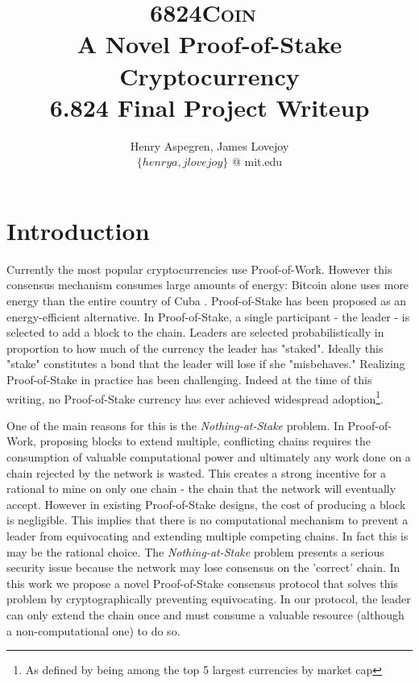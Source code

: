 \documentclass{article}
\newcommand{\coin}{ \textsc{6824Coin}\ }
\begin{document}
\title{%
  \coin \\ 
  A Novel Proof-of-Stake Cryptocurrency\\
  \large 6.824 Final Project Writeup}
\author{Henry Aspegren, James Lovejoy \\ $\{ henrya, jlovejoy \}$ @ mit.edu}
\maketitle

\section{Introduction}

Currently the most popular cryptocurrencies use Proof-of-Work. However this consensus mechanism consumes large amounts of energy: Bitcoin alone uses more energy than the entire country of Cuba \cite{energy}. Proof-of-Stake has been proposed as an energy-efficient alternative. In Proof-of-Stake, a single participant - the leader - is selected to add a block to the chain. Leaders are selected probabilistically in proportion to how much of the currency the leader has "staked". Ideally this "stake" constitutes a bond that the leader will lose if she "misbehaves." Realizing Proof-of-Stake in practice has been challenging. Indeed at the time of this writing, no Proof-of-Stake currency has ever achieved widespread adoption\footnote{As defined by being among the top 5 largest currencies by market cap}. 

One of the main reasons for this is the \textit{Nothing-at-Stake} problem. In Proof-of-Work, proposing blocks to extend multiple, conflicting chains requires the consumption of valuable computational power and ultimately any work done on a chain rejected by the network is wasted. This creates a strong incentive for a rational to mine on only one chain - the chain that the network will eventually accept. However in existing Proof-of-Stake designs, the cost of producing a block is negligible. This implies that there is no computational mechanism to prevent a leader from equivocating and extending multiple competing chains. In fact this is may be the rational choice. The \textit{Nothing-at-Stake} problem presents a serious security issue because the network may lose consensus on the 'correct' chain. In this work we propose a novel Proof-of-Stake consensus protocol that solves this problem by cryptographically preventing equivocating. In our protocol, the leader can only extend the chain once and must consume a valuable resource (although a non-computational one) to do so.
\end{document}
